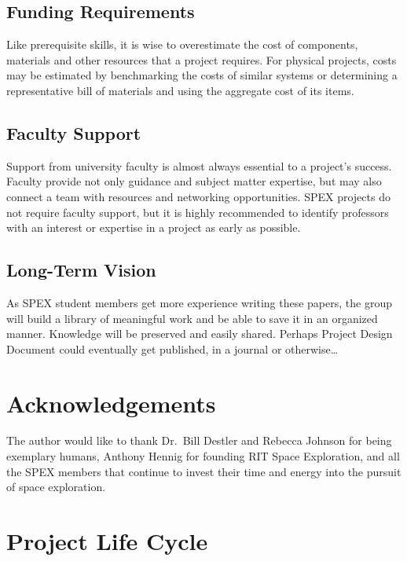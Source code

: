 \documentclass[conference]{IEEEtran} %
\begin{document}
\subsection{Funding Requirements}
Like prerequisite skills, it is wise to overestimate the cost of components, materials and other resources that a project requires.
For physical projects, costs may be estimated by benchmarking the costs of similar systems or determining a representative bill of materials and using the aggregate cost of its items.

\subsection{Faculty Support}
Support from university faculty is almost always essential to a project's success.
Faculty provide not only guidance and subject matter expertise, but may also connect a team with resources and networking opportunities.
SPEX projects do not require faculty support, but it is highly recommended to identify professors with an interest or expertise in a project as early as possible.

\subsection{Long-Term Vision}
\label{sec:vision}
As SPEX student members get more experience writing these papers, the group will build a library of meaningful work and be able to save it in an organized manner.
Knowledge will be preserved and easily shared.
Perhaps Project Design Document could eventually get published, in a journal or otherwise\ldots

\section*{Acknowledgements}
The author would like to thank Dr.~Bill Destler and Rebecca Johnson for being exemplary humans, Anthony Hennig for founding RIT Space Exploration, and all the SPEX members that continue to invest their time and energy into the pursuit of space exploration.

\onecolumn
\appendices{}
\section{Project Life Cycle}
\end{document}
